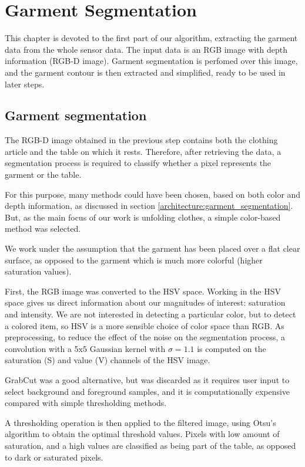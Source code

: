 \chapter{Garment Segmentation}
\label{garment_segmentation}

This chapter is devoted to the first part of our algorithm, extracting the garment data from the whole sensor data. The input data is an RGB image with depth information (RGB-D image). Garment segmentation is perfomed over this image, and the garment contour is then extracted and simplified, ready to be used in later steps.


\section{Garment segmentation}
\label{garment_segmentation_mask}

The RGB-D image obtained in the previous step contains both the clothing article and the table on which it rests. Therefore, after retrieving the data, a segmentation process is required to classify whether a pixel represents the garment or the table.

For this purpose, many methods could have been chosen, based on both color and depth information, as discussed in section \ref{architecture:garment_segmentation}. But, as the main focus of our work is unfolding clothes, a simple color-based method was selected. 

We work under the assumption that the garment has been placed over a flat clear surface, as opposed to the garment which is much more colorful (higher saturation values). 

First, the RGB image was converted to the HSV space. Working in the HSV space gives us direct information about our magnitudes of interest: saturation and intensity. We are not interested in detecting a particular color, but to detect a colored item, so HSV is a more sensible choice of color space than RGB. As preprocessing, to reduce the effect of the noise on the segmentation process, a convolution with a 5x5 Gaussian kernel with $\sigma=1.1$ is computed on the saturation (S) and value (V) channels of the HSV image.

GrabCut  was a good alternative, but was discarded as it requires user input to select background and foreground samples, and it is computationally expensive compared with simple thresholding methods.

A thresholding operation is then applied to the filtered image, using Otsu's algorithm  to obtain the optimal threshold values. Pixels with low amount of saturation, and a high values are classified as being part of the table, as opposed to dark or saturated pixels.

